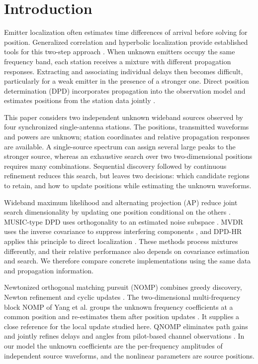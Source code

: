 \documentclass[a4paper,fleqn,review]{cas-sc}
\begin{document}
\section{Introduction}
Emitter localization often estimates time differences of arrival before solving for position. Generalized correlation and hyperbolic localization provide established tools for this two-step approach \cite{KnappCarter1976,ChanHo1994}. When unknown emitters occupy the same frequency band, each station receives a mixture with different propagation responses. Extracting and associating individual delays then becomes difficult, particularly for a weak emitter in the presence of a stronger one. Direct position determination (DPD) incorporates propagation into the observation model and estimates positions from the station data jointly \cite{ChenHudsonYao2002,WeissAmar2005}.

This paper considers two independent unknown wideband sources observed by four synchronized single-antenna stations. The positions, transmitted waveforms and powers are unknown; station coordinates and relative propagation responses are available. A single-source spectrum can assign several large peaks to the stronger source, whereas an exhaustive search over two two-dimensional positions requires many combinations. Sequential discovery followed by continuous refinement reduces this search, but leaves two decisions: which candidate regions to retain, and how to update positions while estimating the unknown waveforms.

Wideband maximum likelihood and alternating projection (AP) reduce joint search dimensionality by updating one position conditional on the others \cite{ChenHudsonYao2002}. MUSIC-type DPD uses orthogonality to an estimated noise subspace \cite{WeissAmar2005}. MVDR uses the inverse covariance to suppress interfering components \cite{Capon1969}, and DPD-HR applies this principle to direct localization \cite{TirerWeiss2016}. These methods process mixtures differently, and their relative performance also depends on covariance estimation and search. We therefore compare concrete implementations using the same data and propagation information.

Newtonized orthogonal matching pursuit (NOMP) combines greedy discovery, Newton refinement and cyclic updates \cite{Mamandipoor2016}. The two-dimensional multi-frequency block NOMP of Yang et al. groups the unknown frequency coefficients at a common position and re-estimates them after position updates \cite{Yang2022}. It supplies a close reference for the local update studied here. QNOMP eliminates path gains and jointly refines delays and angles from pilot-based channel observations \cite{Zeng2025}. In our model the unknown coefficients are the per-frequency amplitudes of independent source waveforms, and the nonlinear parameters are source positions.
\end{document}
